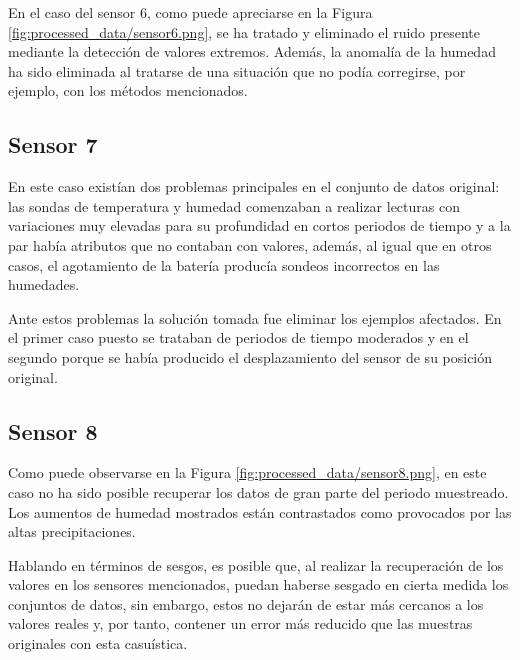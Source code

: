 En el caso del sensor 6, como puede apreciarse en la Figura 
\ref{fig:processed_data/sensor6.png}, se ha tratado y eliminado el ruido presente 
mediante la detección de valores extremos. Además, la anomalía de la humedad ha sido
eliminada al tratarse de una situación que no podía corregirse, por ejemplo, con los
métodos mencionados.

\newpage

\subsection{Sensor 7}

En este caso existían dos problemas principales en el conjunto de datos original:
las sondas de temperatura y humedad comenzaban a realizar lecturas con variaciones
muy elevadas para su profundidad en cortos periodos de tiempo y a la par
había atributos que no contaban con valores, además, al igual que en otros casos,
el agotamiento de la batería producía sondeos incorrectos en las humedades.

Ante estos problemas la solución tomada fue eliminar los ejemplos 
afectados. En el primer caso puesto se trataban de periodos de tiempo moderados y 
en el segundo porque se había producido el desplazamiento del sensor de su posición 
original.

\newpage

\subsection{Sensor 8}

Como puede observarse en la Figura \ref{fig:processed_data/sensor8.png}, en este caso
no ha sido posible recuperar los datos de gran parte del periodo muestreado.
Los aumentos de humedad mostrados están contrastados como 
provocados por las altas precipitaciones.

Hablando en términos de sesgos, es posible que, al realizar la recuperación de los
valores en los sensores mencionados, puedan haberse sesgado en cierta medida
los conjuntos de datos, sin embargo, estos no dejarán de estar más cercanos a los
valores reales y, por tanto, contener un error más reducido que las muestras originales
con esta casuística.